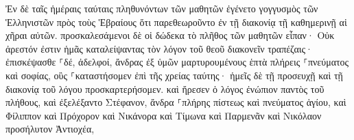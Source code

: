 \documentclass{openreader}
\begin{document}
Ἐν δὲ ταῖς ἡμέραις ταύταις πληθυνόντων τῶν μαθητῶν ἐγένετο γογγυσμὸς τῶν Ἑλληνιστῶν πρὸς τοὺς Ἑβραίους ὅτι παρεθεωροῦντο ἐν τῇ διακονίᾳ τῇ καθημερινῇ αἱ χῆραι αὐτῶν. 
προσκαλεσάμενοι δὲ οἱ δώδεκα τὸ πλῆθος τῶν μαθητῶν εἶπαν· Οὐκ ἀρεστόν ἐστιν ἡμᾶς καταλείψαντας τὸν λόγον τοῦ θεοῦ διακονεῖν τραπέζαις· 
ἐπισκέψασθε ⸀δέ, ἀδελφοί, ἄνδρας ἐξ ὑμῶν μαρτυρουμένους ἑπτὰ πλήρεις ⸀πνεύματος καὶ σοφίας, οὓς ⸀καταστήσομεν ἐπὶ τῆς χρείας ταύτης· 
ἡμεῖς δὲ τῇ προσευχῇ καὶ τῇ διακονίᾳ τοῦ λόγου προσκαρτερήσομεν. 
καὶ ἤρεσεν ὁ λόγος ἐνώπιον παντὸς τοῦ πλήθους, καὶ ἐξελέξαντο Στέφανον, ἄνδρα ⸀πλήρης πίστεως καὶ πνεύματος ἁγίου, καὶ Φίλιππον καὶ Πρόχορον καὶ Νικάνορα καὶ Τίμωνα καὶ Παρμενᾶν καὶ Νικόλαον προσήλυτον Ἀντιοχέα, 
\end{document}
